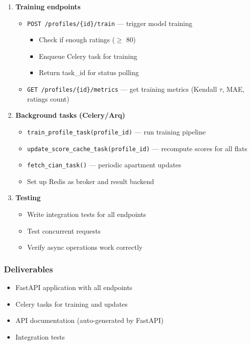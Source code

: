 \documentclass[12pt,a4paper]{article}
\begin{document}
\begin{enumerate}
    \item \textbf{Training endpoints}
    \begin{itemize}
        \item \texttt{POST /profiles/\{id\}/train} — trigger model training
        \begin{itemize}
            \item Check if enough ratings ($\geq$ 80)
            \item Enqueue Celery task for training
            \item Return task\_id for status polling
        \end{itemize}
        \item \texttt{GET /profiles/\{id\}/metrics} — get training metrics (Kendall $\tau$, MAE, ratings count)
    \end{itemize}
    
    \item \textbf{Background tasks (Celery/Arq)}
    \begin{itemize}
        \item \texttt{train\_profile\_task(profile\_id)} — run training pipeline
        \item \texttt{update\_score\_cache\_task(profile\_id)} — recompute scores for all flats
        \item \texttt{fetch\_cian\_task()} — periodic apartment updates
        \item Set up Redis as broker and result backend
    \end{itemize}
    
    \item \textbf{Testing}
    \begin{itemize}
        \item Write integration tests for all endpoints
        \item Test concurrent requests
        \item Verify async operations work correctly
    \end{itemize}
\end{enumerate}

\subsubsection{Deliverables}
\begin{itemize}
    \item FastAPI application with all endpoints
    \item Celery tasks for training and updates
    \item API documentation (auto-generated by FastAPI)
    \item Integration tests
\end{itemize}
\end{document}
